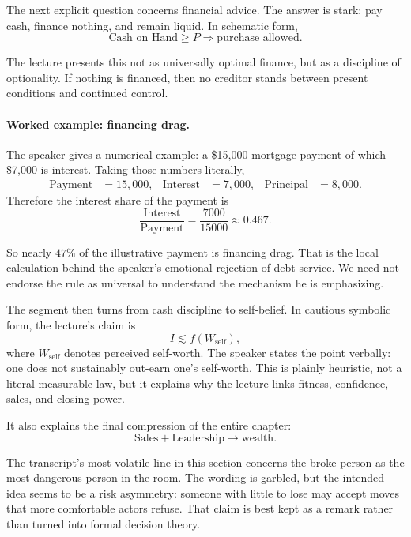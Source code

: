 The next explicit question concerns financial advice. The answer is stark: pay cash, finance nothing, and remain liquid. In schematic form,
\begin{equation}
\text{Cash on Hand} \ge P \Rightarrow \text{purchase allowed}.
\end{equation}

The lecture presents this not as universally optimal finance, but as a discipline of optionality. If nothing is financed, then no creditor stands between present conditions and continued control.

\paragraph{Worked example: financing drag.}
The speaker gives a numerical example: a \$15{,}000 mortgage payment of which \$7{,}000 is interest. Taking those numbers literally,
\begin{align}
\text{Payment} &= 15{,}000, &
\text{Interest} &= 7{,}000, &
\text{Principal} &= 8{,}000.
\end{align}
Therefore the interest share of the payment is
\begin{equation}
\frac{\text{Interest}}{\text{Payment}}
=
\frac{7000}{15000}
\approx 0.467.
\end{equation}

So nearly \(47\%\) of the illustrative payment is financing drag. That is the local calculation behind the speaker's emotional rejection of debt service. We need not endorse the rule as universal to understand the mechanism he is emphasizing.

The segment then turns from cash discipline to self-belief. In cautious symbolic form, the lecture's claim is
\begin{equation}
I \lesssim f(W_{\text{self}}),
\end{equation}
where \(W_{\text{self}}\) denotes perceived self-worth. The speaker states the point verbally: one does not sustainably out-earn one's self-worth. This is plainly heuristic, not a literal measurable law, but it explains why the lecture links fitness, confidence, sales, and closing power.

It also explains the final compression of the entire chapter:
\begin{equation}
\text{Sales}+\text{Leadership} \to \text{wealth}.
\end{equation}

The transcript's most volatile line in this section concerns the broke person as the most dangerous person in the room. The wording is garbled, but the intended idea seems to be a risk asymmetry: someone with little to lose may accept moves that more comfortable actors refuse. That claim is best kept as a remark rather than turned into formal decision theory.

